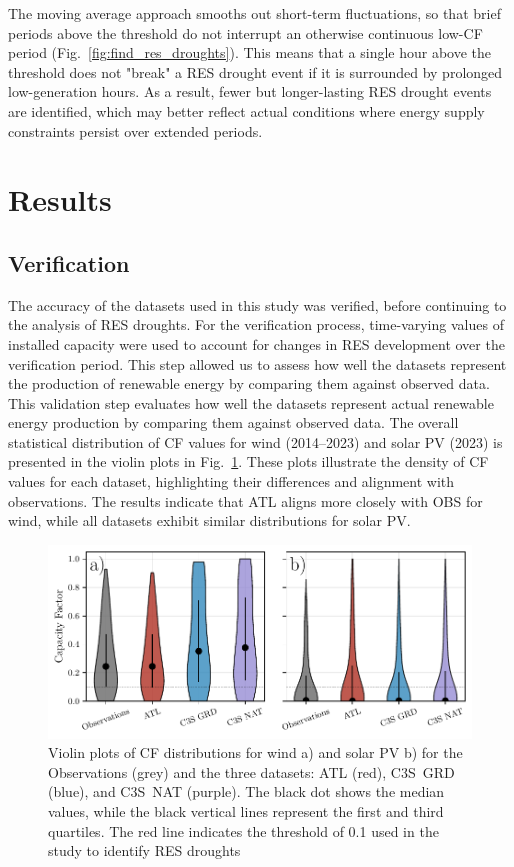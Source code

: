 \documentclass[preprint, 12pt]{elsarticle}
\begin{document}
The moving average approach smooths out short-term fluctuations, so that brief periods above the threshold do not interrupt an otherwise continuous low-CF period (Fig.~\ref{fig:find_res_droughts}). This means that a single hour above the threshold does not "break" a RES drought event if it is surrounded by prolonged low-generation hours. As a result, fewer but longer-lasting RES drought events are identified, which may better reflect actual conditions where energy supply constraints persist over extended periods.

\section{Results}
\label{sec:results}

\subsection{Verification}
\label{sec:verification}

The accuracy of the datasets used in this study was verified, before continuing to the analysis of RES droughts. For the verification process, time-varying values of installed capacity were used to account for changes in RES development over the verification period. This step allowed us to assess how well the datasets represent the production of renewable energy by comparing them against observed data. This validation step evaluates how well the datasets represent actual renewable energy production by comparing them against observed data. The overall statistical distribution of CF values for wind (2014–2023) and solar PV (2023) is presented in the violin plots in Fig.~\ref{fig:violin_plots}. These plots illustrate the density of CF values for each dataset, highlighting their differences and alignment with observations. The results indicate that ATL aligns more closely with OBS for wind, while all datasets exhibit similar distributions for solar PV.

\begin{figure}[ht!]
	\centering
	\includegraphics[width=\textwidth]{violin_plots_verification.pdf}
	\caption{Violin plots of CF distributions for wind a) and solar PV b) for the Observations (grey) and the three datasets: ATL (red), C3S~GRD (blue), and C3S~NAT (purple). The black dot shows the median values, while the black vertical lines represent the first and third quartiles. The red line indicates the threshold of 0.1 used in the study to identify RES droughts}
	\label{fig:violin_plots}
\end{figure}
\end{document}
